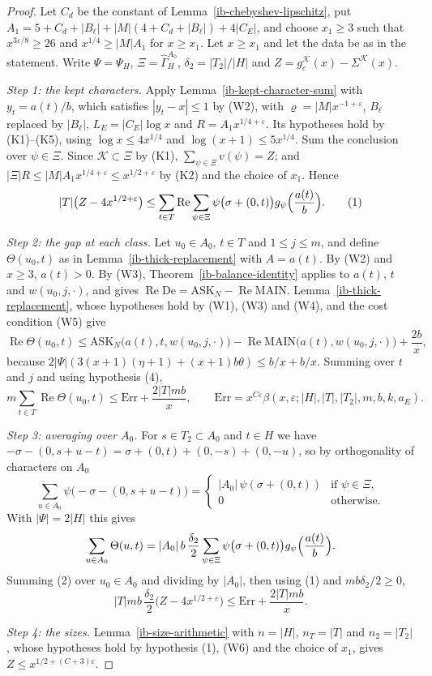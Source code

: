 \begin{proof}
Let $C_d$ be the constant of Lemma~\ref{ib-chebyshev-lipschitz}, put
$A_1=5+C_d+|B_\ell|+|M|(4+C_d+|B_\ell|)+4|C_E|$, and choose $x_1\geq3$ such that
$x^{3\varepsilon/8}\geq26$ and $x^{1/4}\geq|M|A_1$ for $x\geq x_1$. Let $x\geq x_1$
and let the data be as in the statement. Write $\Psi=\Psi_H$,
$\Xi=\widehat\Gamma_H^{A_0}$, $\delta_2=|T_2|/|H|$ and $Z=g^{\mathcal K}_c(x)-\Sigma^{\mathcal K}(x)$.

\emph{Step 1: the kept characters.} Apply Lemma~\ref{ib-kept-character-sum} with
$y_t=a(t)/b$, which satisfies $|y_t-x|\leq1$ by (W2), with $\varrho=|M|x^{-1+\varepsilon}$,
$B_\ell$ replaced by $|B_\ell|$, $L_E=|C_E|\log x$ and $R=A_1x^{1/4+\varepsilon}$.
Its hypotheses hold by (K1)--(K5), using $\log x\leq4x^{1/4}$ and
$\log(x+1)\leq5x^{1/4}$. Sum the conclusion over $\psi\in\Xi$. Since
$\mathcal K\subset\Xi$ by (K1), $\sum_{\psi\in\Xi}v(\psi)=Z$; and
$|\Xi|R\leq|M|A_1x^{1/4+\varepsilon}\leq x^{1/2+\varepsilon}$ by (K2) and the
choice of $x_1$. Hence
\[
 |T|\bigl(Z-4x^{1/2+\varepsilon}\bigr)\leq\sum_{t\in T}\operatorname{Re}\sum_{\psi\in\Xi}
 \psi\bigl(\sigma+(0,t)\bigr)g_\psi\Bigl(\frac{a(t)}b\Bigr).\tag{1}
\]

\emph{Step 2: the gap at each class.} Let $u_0\in A_0$, $t\in T$ and
$1\leq j\leq m$, and define $\Theta(u_0,t)$ as in
Lemma~\ref{ib-thick-replacement} with $A=a(t)$. By (W2) and $x\geq3$, $a(t)>0$.
By (W3), Theorem~\ref{ib-balance-identity} applies to $a(t)$, $t$ and
$w(u_0,j,\cdot)$, and gives
$\operatorname{Re}\mathrm{De}=\mathrm{ASK}_N-\operatorname{Re}\mathrm{MAIN}$.
Lemma~\ref{ib-thick-replacement}, whose hypotheses hold by (W1), (W3) and (W4),
and the cost condition (W5) give
\[
 \operatorname{Re}\Theta(u_0,t)\leq\mathrm{ASK}_N\bigl(a(t),t,w(u_0,j,\cdot)\bigr)
 -\operatorname{Re}\mathrm{MAIN}\bigl(a(t),w(u_0,j,\cdot)\bigr)+\frac{2b}x,
\]
because $2|\Psi|(3(x+1)(\eta+1)+(x+1)b\theta)\leq b/x+b/x$. Summing over $t$ and
$j$ and using hypothesis (4),
\[
 m\sum_{t\in T}\operatorname{Re}\Theta(u_0,t)\leq\mathrm{Err}+\frac{2|T|mb}x,
 \qquad\mathrm{Err}=x^{C\varepsilon}\beta(x,\varepsilon;|H|,|T|,|T_2|,m,b,k,a_E).\tag{2}
\]

\emph{Step 3: averaging over $A_0$.} For $s\in T_2\subset A_0$ and $t\in H$ we
have $-\sigma-(0,s+u-t)=\sigma+(0,t)+(0,-s)+(0,-u)$, so by orthogonality of
characters on $A_0$
\[
 \sum_{u\in A_0}\psi\bigl(-\sigma-(0,s+u-t)\bigr)=
 \begin{cases}|A_0|\,\psi(\sigma+(0,t))&\text{if }\psi\in\Xi,\\0&\text{otherwise.}\end{cases}
\]
With $|\Psi|=2|H|$ this gives
\[
 \sum_{u\in A_0}\Theta(u,t)=|A_0|\,b\,\frac{\delta_2}2\sum_{\psi\in\Xi}
 \psi\bigl(\sigma+(0,t)\bigr)g_\psi\Bigl(\frac{a(t)}b\Bigr).
\]
Summing (2) over $u_0\in A_0$ and dividing by $|A_0|$, then using (1) and
$mb\delta_2/2\geq0$,
\[
 |T|mb\,\frac{\delta_2}2\bigl(Z-4x^{1/2+\varepsilon}\bigr)\leq\mathrm{Err}+\frac{2|T|mb}x.
\]

\emph{Step 4: the sizes.} Lemma~\ref{ib-size-arithmetic} with $n=|H|$,
$n_T=|T|$ and $n_2=|T_2|$, whose hypotheses hold by hypothesis (1), (W6) and
the choice of $x_1$, gives $Z\leq x^{1/2+(C+3)\varepsilon}$.
\end{proof}

